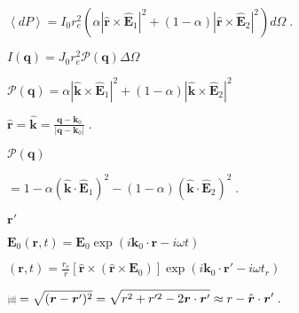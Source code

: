\documentclass[12pt]{article}
\renewcommand{\vec}[1]{\boldsymbol{#1}}%
\def\lthtmlcheckvsize{\ifdim\ht\sizebox<\vsize 
  \ifdim\wd\sizebox<\hsize\expandafter\hfill\fi \expandafter\vfill
  \else\expandafter\vss\fi}%
\begin{document}
{\newpage\clearpage
{}%
$\displaystyle \left\langle dP \right\rangle  = I_0 r_e^2  (\alpha | \hat{\vec{r}} \times  \hat{\vec{E}}_1 |^2 + (1-\alpha)
| \hat{\vec{r}} \times  \hat{\vec{E}}_2 |^2)  d\Omega\;.$%
\lthtmlindisplaymathZ
\lthtmlcheckvsize\clearpage}

{\newpage\clearpage
{}%
$\displaystyle I(\vec{q}) = J_0 r_e^2  \mathcal{P}(\vec{q}) \Delta \Omega$%
\lthtmlindisplaymathZ
\lthtmlcheckvsize\clearpage}

{\newpage\clearpage
{}%
$\displaystyle \mathcal{P}(\vec{q}) = \alpha | \hat{\vec{k}} \times  \hat{\vec{E}}_1 |^2 + (1-\alpha) |
\hat{\vec{k}} \times \hat{\vec{E}}_2 |^2$%
\lthtmlindisplaymathZ
\lthtmlcheckvsize\clearpage}

{\newpage\clearpage
{}%
$\displaystyle \hat{\vec{r}} = \hat{\vec{k}} = \frac{\vec{q} - \vec{k}_0}{\left| \vec{q} - \vec{k}_0 \right|} \;.$%
\lthtmlindisplaymathZ
\lthtmlcheckvsize\clearpage}

{\newpage\clearpage
{}%
$\displaystyle \mathcal{P}(\vec{q})$%
\lthtmlindisplaymathZ
\lthtmlcheckvsize\clearpage}

{\newpage\clearpage
{}%
$\displaystyle = 1 - \alpha(\hat{\vec{k}} \cdot \hat{\vec{E}}_1 )^2 -
(1-\alpha)(\hat{\vec{k}} \cdot \hat{\vec{E}}_2 )^2 \;.$%
\lthtmlindisplaymathZ
\lthtmlcheckvsize\clearpage}

{\newpage\clearpage
{}%
$ \vec{r}'$%
\lthtmlindisplaymathZ
\lthtmlcheckvsize\clearpage}

{\newpage\clearpage
{}%
$\displaystyle \vec{E}_0(\vec{r},t) = \vec{E}_0 \exp(i\vec{k}_0 \cdot \vec{r} - i \omega t)$%
\lthtmlindisplaymathZ
\lthtmlcheckvsize\clearpage}

{\newpage\clearpage
{}%
$\displaystyle (\vec{r},t) =  \frac{r_e}{r} [\hat{\vec{r}} \times ( \hat{\vec{r}} \times  \vec{E}_0 )] \exp(i\vec{k}_0 \cdot \vec{r}' - i \omega t_r)$%
\lthtmlindisplaymathZ
\lthtmlcheckvsize\clearpage}

{\newpage\clearpage
{}%
$\displaystyle {\mbox{$\resizebox{.09in}{.08in}{\texttt{[image: fonts/ScriptR]}}$}}= \sqrt{(\vec{r} - \vec{r}')^2} = \sqrt{r^2 + r'^2 -2\vec{r}\cdot
\vec{r}'} \approx r  - \hat{\vec{r}}\cdot \vec{r}' \;.$%
\lthtmlindisplaymathZ
\lthtmlcheckvsize\clearpage}
\end{document}
